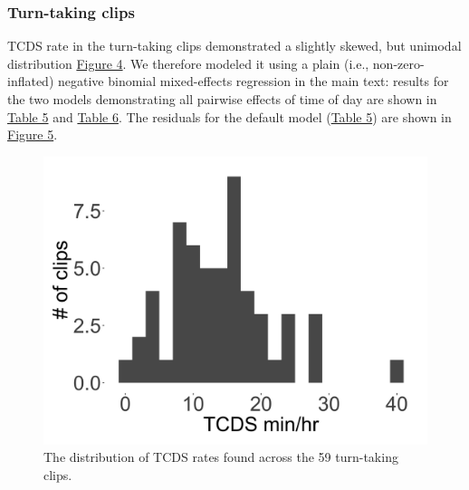 \documentclass[,man,floatsintext]{apa6}
\begin{document}
\FloatBarrier

\subsubsection{Turn-taking clips}\label{models-tcds-turntaking}

TCDS rate in the turn-taking clips demonstrated a slightly skewed, but
unimodal distribution \protect\hyperlink{fig4}{Figure 4}. We therefore
modeled it using a plain (i.e., non-zero-inflated) negative binomial
mixed-effects regression in the main text: results for the two models
demonstrating all pairwise effects of time of day are shown in
\protect\hyperlink{tab5}{Table 5} and \protect\hyperlink{tab6}{Table 6}.
The residuals for the default model (\protect\hyperlink{tab5}{Table 5})
are shown in \protect\hyperlink{fig5}{Figure 5}.

\FloatBarrier

\begin{figure}[H]

{\centering \includegraphics[width=0.4\linewidth]{www/TCDS_turntaking_distribution} 

}

\caption{The distribution of TCDS rates found across the 59 turn-taking clips.}\label{fig:fig4}
\end{figure}

\FloatBarrier
\end{document}
